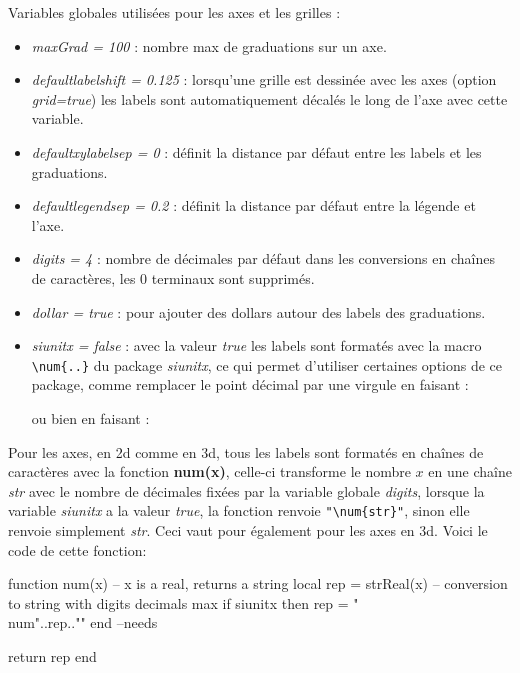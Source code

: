 Variables globales utilisées pour les axes et les grilles :
\begin{itemize}
    \item \emph{maxGrad = 100} : nombre max de graduations sur un axe.
    \item \emph{defaultlabelshift = 0.125} : lorsqu'une grille est dessinée avec les axes (option \emph{grid=true}) les labels sont automatiquement décalés le long de l'axe avec cette variable.
    \item \emph{defaultxylabelsep = 0} : définit la distance par défaut entre les labels et les graduations.
    \item \emph{defaultlegendsep = 0.2} : définit la distance par défaut entre la légende et l'axe.
    \item \emph{digits = 4} : nombre de décimales par défaut dans les conversions en chaînes de caractères, les $0$ terminaux sont supprimés.
    \item \emph{dollar = true} :  pour ajouter des dollars autour des labels des graduations.
    \item \emph{siunitx = false} :  avec la valeur \emph{true} les labels sont formatés avec la macro \verb|\num{..}| du package \emph{siunitx}, ce qui permet d'utiliser certaines options de ce package, comme remplacer le point décimal par une virgule en faisant :\par
    \begin{TeXcode}
    \usepackage[local=FR]{siunitx}
    \end{TeXcode}
    ou bien en faisant :
    \begin{TeXcode}
    \usepackage{siunitx}
    \end{TeXcode}
\end{itemize}
Pour les axes, en 2d comme en 3d, tous les labels sont formatés en chaînes de caractères avec la fonction \textbf{num(x)}, celle-ci transforme le nombre $x$ en une chaîne \emph{str} avec le nombre de décimales fixées par la variable globale \emph{digits}, lorsque la variable \emph{siunitx} a la valeur \emph{true}, la fonction renvoie \verb|"\num{str}"|, sinon elle renvoie simplement \emph{str}. Ceci vaut pour également pour les axes en 3d. Voici le code de cette fonction:
\begin{Luacode}
function num(x) -- x is a real, returns a string
    local rep = strReal(x) -- conversion to string with digits decimals max
    if siunitx then rep = "\\num{"..rep.."}" end --needs \usepackage{siunitx}
    return rep
end
\end{Luacode}

